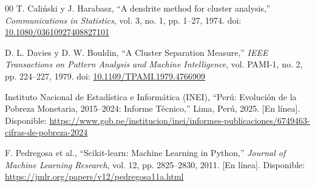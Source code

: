 \documentclass[conference,10pt,letterpaper]{IEEEtran}
\begin{document}
\begin{thebibliography}{00}
 T. Cali\'nski y J. Harabasz, ``A dendrite method for cluster analysis,'' \textit{Communications in Statistics}, vol. 3, no. 1, pp. 1--27, 1974. doi: \href{https://doi.org/10.1080/03610927408827101}{10.1080/03610927408827101}

 D. L. Davies y D. W. Bouldin, ``A Cluster Separation Measure,'' \textit{IEEE Transactions on Pattern Analysis and Machine Intelligence}, vol. PAMI-1, no. 2, pp. 224--227, 1979. doi: \href{https://doi.org/10.1109/TPAMI.1979.4766909}{10.1109/TPAMI.1979.4766909}

 Instituto Nacional de Estadística e Informática (INEI), ``Perú: Evolución de la Pobreza Monetaria, 2015--2024: Informe Técnico,'' Lima, Perú, 2025. [En línea]. Disponible: \url{https://www.gob.pe/institucion/inei/informes-publicaciones/6749463-cifras-de-pobreza-2024}

 F. Pedregosa et al., ``Scikit-learn: Machine Learning in Python,'' \textit{Journal of Machine Learning Research}, vol. 12, pp. 2825--2830, 2011. [En línea]. Disponible: \url{https://jmlr.org/papers/v12/pedregosa11a.html}

\end{thebibliography}
\end{document}
